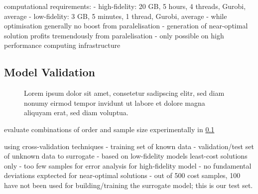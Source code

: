 computational requirements:
- high-fidelity: 20 GB, 5 hours, 4 threads, Gurobi, average 
- low-fidelity: 3 GB, 5 minutes, 1 thread, Gurobi, average
- while optimisation generally no boost from paralelisation
- generation of near-optimal solution profits tremendously from paralelisation
- only possible on high performance computing infrastructure

\subsection{Model Validation}
\label{sec:validation}

\begin{figure}
    \noindent{}
    \noindent{}
    \caption{Lorem ipsum dolor sit amet, consetetur sadipscing elitr, sed diam nonumy eirmod tempor invidunt ut labore et dolore magna aliquyam erat, sed diam voluptua.}
    \label{fig:error}
\end{figure}

evaluate combinations of order and sample size experimentally in \cref{sec:validation}

using cross-validation techniques 
- training set of known data
- validation/test set of unknown data to surrogate \cite{gratiet_metamodel-based_2015}
- based on low-fidelity models least-cost solutions only
    - too few samples for error analysis for high-fidelity model
    - no fundamental deviations exptected for near-optimal solutions
- out of 500 cost samples, 100 have not been used for building/training the surrogate model; this is our test set.

